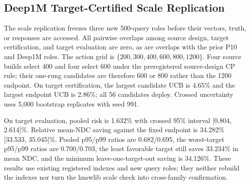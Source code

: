 \documentclass[sigconf,anonymous]{acmart}
\begin{document}
\subsection{Deep1M Target-Certified Scale Replication}
The scale replication freezes three new 500-query roles before their vectors, truth, or responses are accessed. All pairwise overlaps among source design, target certification, and target evaluation are zero, as are overlaps with the prior P10 and Deep1M roles. The action grid is $\{200,300,400,600,800,1200\}$. Four source builds select 400 and four select 600 under the preregistered source-design CP rule; their one-rung candidates are therefore 600 or 800 rather than the 1200 endpoint. On target certification, the largest candidate UCB is 4.65\% and the largest endpoint UCB is 2.86\%; all 56 candidates deploy. Crossed uncertainty uses 5,000 bootstrap replicates with seed 991.

On target evaluation, pooled risk is 1.632\% with crossed 95\% interval [0.804, 2.614]\%. Relative mean-NDC saving against the fixed endpoint is 34.282\% [33.533, 35.045]\%. Pooled p95/p99 ratios are 0.682/0.695, the worst-target p95/p99 ratios are 0.700/0.703, the least favorable target still saves 33.234\% in mean NDC, and the minimum leave-one-target-out saving is 34.126\%. These results use existing registered indexes and new query roles; they neither rebuild the indexes nor turn the hnswlib scale check into cross-family confirmation.
\end{document}
